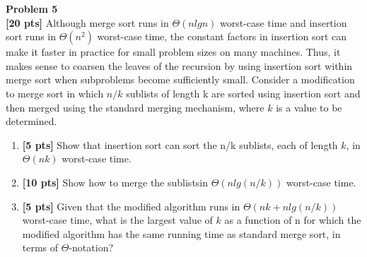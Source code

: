 \documentclass{article}
\newenvironment{problem}[2][Problem]
    { \begin{mdframed}[backgroundcolor=gray!20] \textbf{#1 #2} \\}
    {  \end{mdframed}}
\begin{document}
\newpage
\begin{problem}{5}
\textbf{[20 pts]}
Although merge sort runs in $\Theta(n lg n)$ worst-case time and insertion sort runs in $\Theta(n^2)$ worst-case time, the constant factors in insertion sort can make it faster in practice for small problem sizes on many machines. Thus, it makes sense to coarsen the leaves of the recursion by using insertion sort within merge sort when subproblems become sufficiently small. Consider a modification to merge sort in which $n/k$ sublists of length k are sorted using insertion sort and then merged using the standard merging mechanism, where $k$ is a value to be determined.
\begin{enumerate}
	\item\textbf{[5 pts]} Show that insertion sort can sort the n/k sublists, each of length $k$, in $\Theta(nk)$ worst-case time.
	\item\textbf{[10 pts]} Show how to merge the sublistsin $\Theta(nlg(n/k))$ worst-case time.
	\item\textbf{[5 pts]}  Given that the modified algorithm runs in $\Theta(nk + nlg(n/k))$ worst-case time, what is the largest value of $k$ as a function of n for which the modified algorithm has the same running time as standard merge sort, in terms of $\Theta$-notation?
\end{enumerate}
\end{problem}
\end{document}
